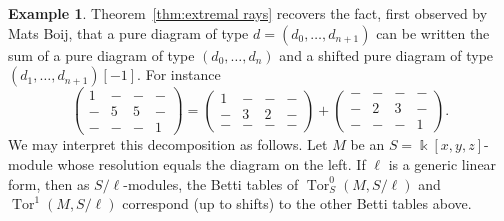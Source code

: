 \documentclass[12pt]{amsart}
\newtheorem{lemma}{Lemma}[section]
\theoremstyle{definition}
\newtheorem{example}[lemma]{Example}
\newtheorem{defn}[lemma]{Definition}
\theoremstyle{remark}
\newcommand{\Tor}{\operatorname{Tor}}
\newcommand{\kk}{\Bbbk}
\newcommand{\QQ}{\mathbb{Q}}
\newcommand{\UU}{\mathrm{U}}
\newcommand{\VV}{\mathrm{V}}
\newcommand{\cE}{\mathcal{E}}
\newcommand{\defi}[1]{\textsf{#1}} %
\begin{document}
\begin{example}
Theorem~\ref{thm:extremal rays} recovers the fact, first observed by Mats Boij, that a pure diagram of type $d=(d_0, \dots, d_{n+1})$ can be written the sum of a pure diagram of type $(d_0, \dots, d_n)$ and a shifted pure diagram of type $(d_1, \dots, d_{n+1})[-1]$.  For instance
\[
\begin{pmatrix}
1&-&-&-\\
-&5&5&-\\
-&-&-&1
\end{pmatrix}
=
\begin{pmatrix}
1&-&-&-\\
-&3&2&-\\
-&-&-&-
\end{pmatrix}
+
\begin{pmatrix}
-&-&-&-\\
-&2&3&-\\
-&-&-&1
\end{pmatrix}.
\]
We may interpret this decomposition as follows.  Let $M$ be an $S=\kk[x,y,z]$-module whose resolution equals the diagram on the left. If $\ell$ is a generic linear form, then as $S/\ell$-modules, the Betti tables of $\Tor^0_S(M,S/\ell)$ and $\Tor^1(M,S/\ell)$ correspond (up to shifts) to the other Betti tables above.
\end{example}
%
%
%
%
\end{document}
